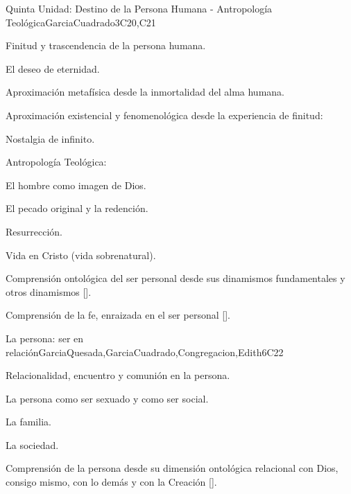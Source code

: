 \begin{syllabus}
\begin{unit}{}{Quinta Unidad: Destino de la Persona Humana - Antropología Teológica}{GarciaCuadrado}{3}{C20,C21}
\begin{topics}
 	 \item Finitud y trascendencia de la persona humana.
 	 \item El deseo de eternidad.
 	 \item Aproximación metafísica desde la inmortalidad del alma humana.
 	 \item Aproximación existencial y fenomenológica desde la experiencia de finitud:
		\begin{subtopics}
			\item Nostalgia de infinito.
		\end{subtopics}	
 	 \item Antropología Teológica:
 	 	\begin{subtopics}
			\item El hombre como imagen de Dios.
			\item El pecado original y la redención.
			\item Resurrección.	
			\item Vida en Cristo (vida sobrenatural). 
		\end{subtopics}
\end{topics}
\begin{learningoutcomes}
	\item Comprensión ontológica del ser personal desde sus dinamismos fundamentales y otros dinamismos [\Usage].
	\item Comprensión de la fe, enraizada en el ser personal [\Usage].
\end{learningoutcomes}
\end{unit}

\begin{unit}{}{La persona: ser en relación}{GarciaQuesada,GarciaCuadrado,Congregacion,Edith}{6}{C22}
\begin{topics}
 	 \item Relacionalidad, encuentro y comunión en la persona.
 	 \item La persona como ser sexuado y como ser social.
 	 \item La familia.
 	 \item La sociedad.
\end{topics}
\begin{learningoutcomes}
	\item Comprensión de la persona desde su dimensión ontológica relacional con Dios, consigo mismo, con lo demás y con la Creación [\Usage].
\end{learningoutcomes}
\end{unit}



\begin{coursebibliography}
\end{coursebibliography}

\end{syllabus}
